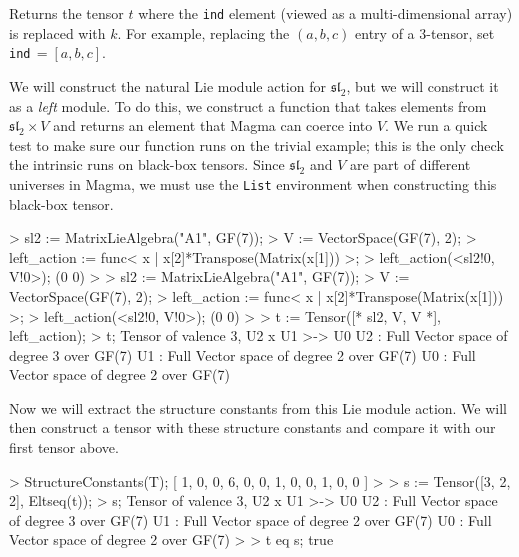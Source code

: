 Returns the tensor $t$ where the \texttt{ind} element (viewed as a multi-dimensional array) is replaced with $k$. 
For example, replacing the $(a,b,c)$ entry of a $3$-tensor, set \texttt{ind}$\,=[a,b,c]$. 

\begin{example}[SCFromBBTensors]

We will construct the natural Lie module action for $\mathfrak{sl}_2$, but we will construct it as a \emph{left} module. 
To do this, we construct a function that takes elements from $\mathfrak{sl}_2\times V$ and returns an element that Magma can coerce into $V$. 
We run a quick test to make sure our function runs on the trivial example; this is the only check the intrinsic runs on black-box tensors. 
Since $\mathfrak{sl}_2$ and $V$ are part of different universes in Magma, we must use the \texttt{List} environment when constructing this black-box tensor. 

\begin{code}
> sl2 := MatrixLieAlgebra("A1", GF(7));
> V := VectorSpace(GF(7), 2);
> left_action := func< x | x[2]*Transpose(Matrix(x[1])) >;
> left_action(<sl2!0, V!0>);
(0 0)
> 
> sl2 := MatrixLieAlgebra("A1", GF(7));
> V := VectorSpace(GF(7), 2);
> left_action := func< x | x[2]*Transpose(Matrix(x[1])) >;
> left_action(<sl2!0, V!0>);
(0 0)
> 
> t := Tensor([* sl2, V, V *], left_action);
> t;
Tensor of valence 3, U2 x U1 >-> U0
U2 : Full Vector space of degree 3 over GF(7)
U1 : Full Vector space of degree 2 over GF(7)
U0 : Full Vector space of degree 2 over GF(7)
\end{code}

Now we will extract the structure constants from this Lie module action. 
We will then construct a tensor with these structure constants and compare it with our first tensor above.

\begin{code}
> StructureConstants(T);
[ 1, 0, 0, 6, 0, 0, 1, 0, 0, 1, 0, 0 ]
> 
> s := Tensor([3, 2, 2], Eltseq(t));
> s;
Tensor of valence 3, U2 x U1 >-> U0
U2 : Full Vector space of degree 3 over GF(7)
U1 : Full Vector space of degree 2 over GF(7)
U0 : Full Vector space of degree 2 over GF(7)
> 
> t eq s;
true
\end{code}
\end{example}


